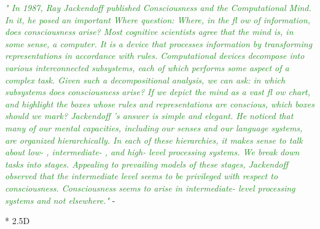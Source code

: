 \documentclass[utf8]{article}
\newcommand{\rewrite}[1]{\textcolor{ForestGreen}{\textit{"#1"}}}
\begin{document}
			\rewrite{
				In 1987, Ray Jackendoff published Consciousness and the Computational Mind. In it, he posed an important Where question: Where, in the fl ow of information, does consciousness arise? Most cognitive scientists agree that the mind is, in some sense, a computer. It is a device that processes information by transforming representations in accordance with rules. Computational devices decompose into various interconnected subsystems, each of which performs some aspect of a complex task. Given such a decompositional analysis, we can ask: in which subsystems does consciousness arise? If we depict the mind as a vast fl ow chart, and highlight the boxes whose rules and representations are conscious, which boxes should we mark? Jackendoff ’s answer is simple and elegant. He noticed that many of our mental capacities, including our senses and our language systems, are organized hierarchically. In each of these hierarchies, it makes sense to talk about low- , intermediate- , and high- level processing systems. We break down tasks into stages. Appealing to prevailing models of these stages, Jackendoff observed that the intermediate level seems to be privileged with respect to consciousness. Consciousness seems to arise in intermediate- level processing systems and not elsewhere.} - \cite{prinz2007intermediate}
			
			
			
			* 2.5D
			
\end{document}
